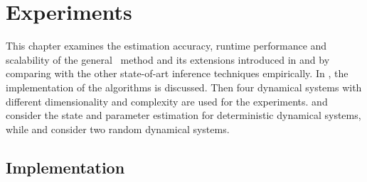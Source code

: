 \chapter{Experiments}
\label{ch-experiments}

This chapter examines the estimation accuracy, runtime performance and scalability of the general \algolpmf\ method and its extensions introduced in  and  by comparing with the other state-of-art inference techniques empirically.
In , the implementation of the algorithms is discussed.
Then four dynamical systems with different dimensionality and complexity are used for the experiments.
 and  consider the state and parameter estimation for deterministic dynamical systems, while  and  consider two random dynamical systems.

\section{Implementation}
\label{sec-implementation}

